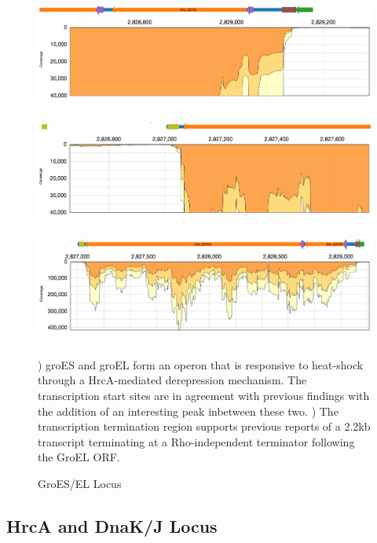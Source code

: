\begin{figure}
\small
{\includegraphics[width=\textwidth,height=1.5in]{images/Assembly/Examples/GroESL/GroESL-TSS.png}
\label{fig:5.15a}}
{\includegraphics[width=\textwidth,height=1.5in]{images/Assembly/Examples/GroESL/GroESL-termination.png}
\label{fig:5.15b}}
{\includegraphics[width=\textwidth,height=1.5in]{images/Assembly/Examples/GroESL/GroESL-curated.png}
\label{fig:5.15c}}
\caption{GroES/EL Locus}
) groES and groEL form an operon that is responsive to heat-shock through a HrcA-mediated derepression mechanism. The transcription start sites are in agreement with previous findings with the addition of an interesting peak inbetween these two. ) The transcription termination region supports previous reports of a 2.2kb transcript terminating at a Rho-independent terminator following the GroEL ORF. 
\end{figure}


\subsection{HrcA and DnaK/J Locus}


